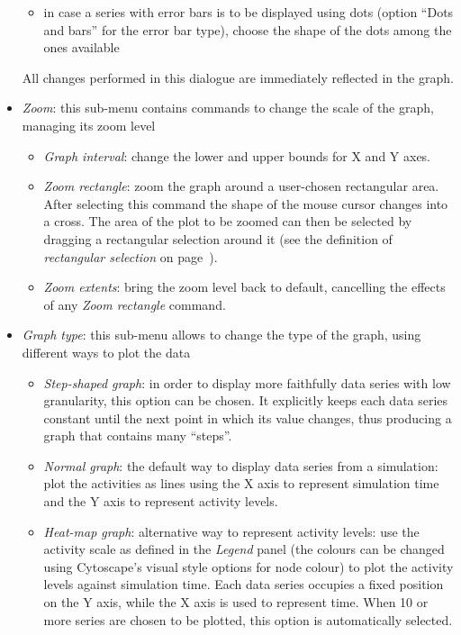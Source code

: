 \documentclass{article}
\begin{document}
\begin{itemize}
\begin{itemize}
	    \item in case a series with error bars is to be displayed using dots (option ``Dots and bars'' for the error bar type),
		  choose the shape of the dots among the ones available
	  \end{itemize}
	  All changes performed in this dialogue are immediately reflected in the graph.
  \item \emph{Zoom}: this sub-menu contains commands to change the scale of the graph, managing its zoom level
    \begin{itemize}
	\item \emph{Graph interval}: change the lower and upper bounds for X and Y axes.
	\item \emph{Zoom rectangle}: zoom the graph around a user-chosen rectangular area.
	  After selecting this command the shape of the mouse cursor changes into a cross. The area of the plot to be
	  zoomed can then be selected by dragging a rectangular selection around it (see the definition of \emph{rectangular
	  selection} on page~\pageref{nota:rectangular-selection}).
	\item \emph{Zoom extents}: bring the zoom level back to default, cancelling the effects of any \emph{Zoom rectangle}
      command.
    \end{itemize}
  \item \emph{Graph type}: this sub-menu allows to change the type of the graph, using different ways to plot the data
    \begin{itemize}
	\item \emph{Step-shaped graph}: in order to display more faithfully data series with low granularity, this option
	      can be chosen. It explicitly keeps each data series constant until the next point in which its value changes,
	      thus producing a graph that contains many ``steps''.
	\item \emph{Normal graph}: the default way to display data series from a simulation: plot the activities as lines
	      using the X axis to represent simulation time and the Y axis to represent activity levels.
	\item \emph{Heat-map graph}: alternative way to represent activity levels: use the activity scale as defined in the
	      \emph{Legend} panel (the colours can be changed using Cytoscape's visual style options for node colour)
	      to plot the activity levels against simulation time. Each data series occupies a fixed position on the Y axis, while
	      the X axis is used to represent time.
	      When 10 or more series are chosen to be plotted, this option is automatically selected.

\end{itemize}
\end{itemize}
\end{document}
